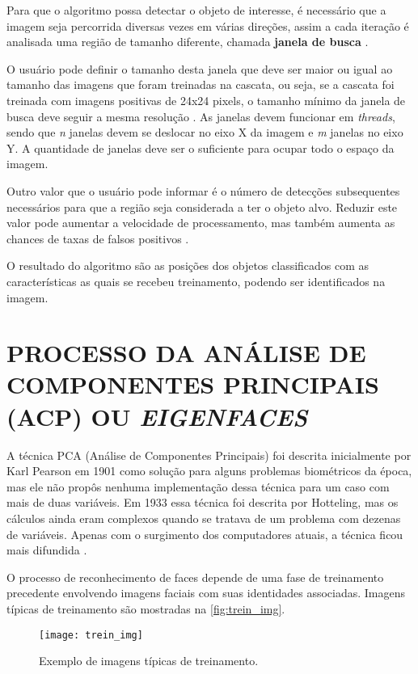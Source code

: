 Para que o algoritmo possa detectar o objeto de interesse, é necessário que a imagem seja percorrida diversas vezes em várias direções, assim a cada iteração é analisada uma região de tamanho diferente, chamada \textbf{janela de busca} \cite{gustavo_cascata}. 

O usuário pode definir o tamanho desta janela que deve ser maior ou igual ao tamanho das imagens que foram treinadas na cascata, ou seja, se a cascata foi treinada com imagens positivas de 24x24 pixels, o tamanho mínimo da janela de busca deve seguir a mesma resolução \cite{gustavo_cascata}. As janelas devem funcionar em \textit{threads}, sendo que \textit{n} janelas devem se deslocar no eixo X da imagem e \textit{m} janelas no eixo Y. A quantidade de janelas deve ser o suficiente para ocupar todo o espaço da imagem.

Outro valor que o usuário pode informar é o número de detecções subsequentes necessários para que a região seja considerada a ter o objeto alvo. Reduzir este valor pode aumentar a velocidade de processamento, mas também aumenta as chances de taxas de falsos positivos \cite{drmathew_java_programming}.

O resultado do algoritmo são as posições dos objetos classificados com as características as quais se recebeu treinamento, podendo ser identificados na imagem.




\section{PROCESSO DA ANÁLISE DE COMPONENTES PRINCIPAIS (ACP) OU \textit{EIGENFACES} } \label{sec:recog_faces}

A técnica PCA (Análise de Componentes Principais) foi descrita inicialmente por Karl Pearson em 1901 como solução para alguns problemas biométricos da época, mas ele não propôs nenhuma implementação dessa técnica para um caso com mais de duas variáveis. Em 1933 essa técnica foi descrita por Hotteling, mas os cálculos ainda eram complexos quando se tratava de um problema com dezenas de variáveis. Apenas com o surgimento dos computadores atuais, a técnica ficou mais difundida \cite{geysilva}. 

O processo de reconhecimento de faces depende de uma fase de treinamento precedente envolvendo imagens faciais com suas identidades associadas. Imagens típicas de treinamento são mostradas na \autoref{fig:trein_img}.
\begin{figure}[h]
	\centering
	\texttt{[image: trein\_img]}
	\caption{Exemplo de imagens típicas de treinamento.}
	\label{fig:trein_img}
\end{figure}

